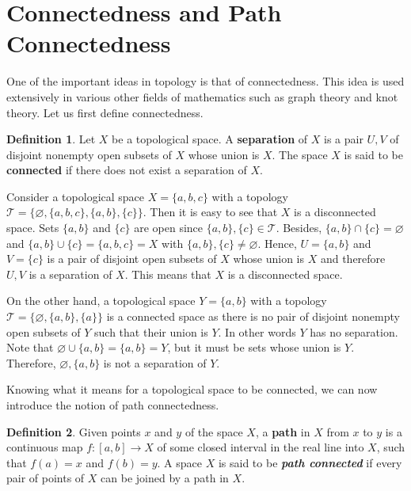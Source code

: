 \documentclass[12pt]{article}
\newcommand{\topology}{\mathcal{T}}                       %
\renewcommand{\emptyset}{\varnothing}                     %
\newcommand\und[1]{\underline{\smash{#1}}}                %
\theoremstyle{definition}
\newtheorem*{definition}{Definition}
\begin{document}

\section*{\centering Connectedness and Path Connectedness}

One of the important ideas in topology is that of connectedness.
This idea is used extensively in various other fields of mathematics such as graph theory and knot theory.
Let us first define connectedness.

\begin{definition}
\cite{8} Let $X$ be a topological space. A \textbf{separation} of $X$ is a pair $U, V$ of disjoint
nonempty open subsets of $X$ whose union is $X$. The space $X$ is said to be \textbf{connected}
if there does not exist a separation of $X$.
\end{definition}

Consider a topological space $X = \{a, b, c\}$ with a topology $\topology = \{\emptyset, \{a, b, c\}, \{a, b\}, \{c\}\}$.
Then it is easy to see that $X$ is a disconnected space. Sets $\{a, b\}$ and $\{c\}$ are open since $\{a, b\}, \{c\} \in \topology$.
Besides, $\{a, b\} \cap \{c\} = \emptyset$ and $\{a, b\} \cup \{c\} = \{a, b, c\} = X$ with $\{a, b\}, \{c\} \neq \emptyset$.
Hence, $U = \{a, b\}$ and $V = \{c\}$ is a pair of disjoint open subsets of $X$ whose union is $X$
and therefore $U, V$ is a separation of $X$. This means that $X$ is a disconnected space.

\bigskip

On the other hand, a topological space $Y = \{a, b\}$ with a topology $\topology = \{\emptyset, \{a, b\}, \{a\}\}$
is a connected space as there is no pair of disjoint nonempty open subsets of $Y$ such that their union is $Y$.
In other words $Y$ has no separation. Note that $\emptyset \cup \{a, b\} = \{a, b\} = Y$, but it must be \und{nonempty}
sets whose union is $Y$. Therefore, $\emptyset, \{a, b\}$ is not a separation of $Y$.

\bigskip

Knowing what it means for a topological space to be connected, we can now introduce the notion
of path connectedness.

\begin{definition}
\cite{9} Given points $x$ and $y$ of the space $X$, a \textbf{path} in $X$ from $x$ to $y$ is a 
continuous map $f : [a, b] \to X$ of some closed interval in the real line into $X$, such
that $f(a) = x$ and $f(b) = y$. A space $X$ is said to be \textit{\textbf{path connected}} if every pair of
points of $X$ can be joined by a path in $X$.
\end{definition}
\end{document}
